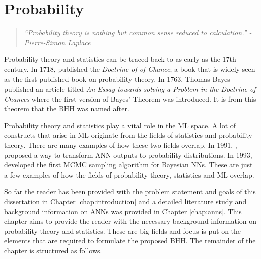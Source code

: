 \chapter{Probability}
\label{chap:probability}

\begin{quotation}
    \textit{``Probability theory is nothing but common sense reduced to calculation.'' - Pierre-Simon Laplace}
\end{quotation}

Probability theory and statistics can be traced back to as early as the 17th century. In 1718, \citeauthor{ref:demoivre:1718} \cite{ref:demoivre:1718} published the \textit{Doctrine of of Chance}; a book that is widely seen as the first published book on probability theory. In 1763, Thomas Bayes \cite{ref:bayes:1763} published an article titled \textit{An Essay towards solving a Problem in the Doctrine of Chances} where the first version of Bayes' Theorem was introduced. It is from this theorem that the \ac{BHH} was named after.

Probability theory and statistics play a vital role in the \ac{ML} space. A lot of constructs that arise in \ac{ML} originate from the fields of statistics and probability theory. There are many examples of how these two fields overlap. In 1991, \citeauthor{ref:denker:1991}, \cite{ref:denker:1991} proposed a way to transform \ac{ANN} outputs to probability distributions. In 1993,
\citeauthor{ref:neal:1993} \cite{ref:neal:1993} developed the first \ac{MCMC} sampling algorithm for Bayesian \acp{NN}. These are just a  few examples of how the fields of probability theory, statistics and \ac{ML} overlap.

So far the reader has been provided with the problem statement and goals of this dissertation in Chapter \ref{chap:introduction} and a detailed literature study and background information on \acp{ANN} was provided in Chapter \ref{chap:anns}. This chapter aims to provide the reader with the necessary background information on probability theory and statistics. These are big fields and focus is put on the elements that are required to formulate the proposed \ac{BHH}. The remainder of the chapter is structured as follows.

